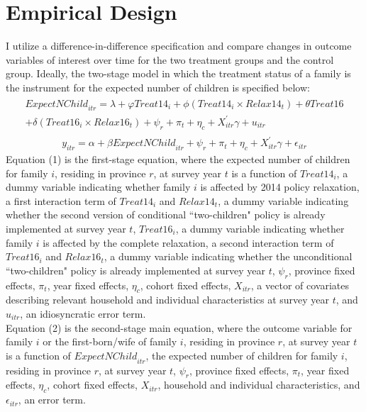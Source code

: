 \documentclass[12pt]{extarticle}
\begin{document}
\section{Empirical Design}
I utilize a difference-in-difference specification and compare changes in outcome variables of interest over time for the two treatment groups and the control group. Ideally, the two-stage model in which the treatment status of a family is the instrument for the expected number of children is specified below: 
\begin{align}
\begin{split}
{ExpectNChild}_{itr} = \lambda+\varphi{Treat14}_i+\phi({Treat14}_i \times {Relax14}_t)+\theta{Treat16} \\ +\delta({Treat16}_i \times {Relax16}_t)+\psi_r+\pi_t+\eta_c+X_{itr}^{'}\gamma+u_{itr}
\end{split}
\end{align}
\begin{align}
y_{itr} = \alpha+\beta{ExpectNChild}_{itr}+\psi_r+\pi_t+\eta_c+X_{itr}^{'}\gamma+\epsilon_{itr}
\end{align}
Equation (1) is the first-stage equation, where the expected number of children for family $i$, residing in province $r$, at survey year $t$ is a function of ${Treat14}_i$, a dummy variable indicating whether family $i$ is affected by 2014 policy relaxation, a first interaction term of ${Treat14}_i$ and ${Relax14}_t$, a dummy variable indicating whether the second version of conditional ``two-children" policy is already implemented at survey year $t$, ${Treat16}_i$, a dummy variable indicating whether family $i$ is affected by the complete relaxation, a second interaction term of ${Treat16}_i$ and ${Relax16}_t$, a dummy variable indicating whether the unconditional ``two-children" policy is already implemented at survey year $t$, $\psi_r$, province fixed effects, $\pi_t$, year fixed effects, $\eta_c$, cohort fixed effects, $X_{itr}$, a vector of covariates describing relevant household and individual characteristics at survey year $t$, and $u_{itr}$, an idiosyncratic error term. \\
\indent Equation (2) is the second-stage main equation, where the outcome variable for family $i$ or the first-born/wife of family $i$, residing in province $r$, at survey year $t$ is a function of ${ExpectNChild}_{itr}$, the expected number of children for family $i$, residing in province $r$, at survey year $t$, $\psi_r$, province fixed effects, $\pi_t$, year fixed effects, $\eta_c$, cohort fixed effects, $X_{itr}$, household and individual characteristics, and $\epsilon_{itr}$, an error term. \\
\end{document}

